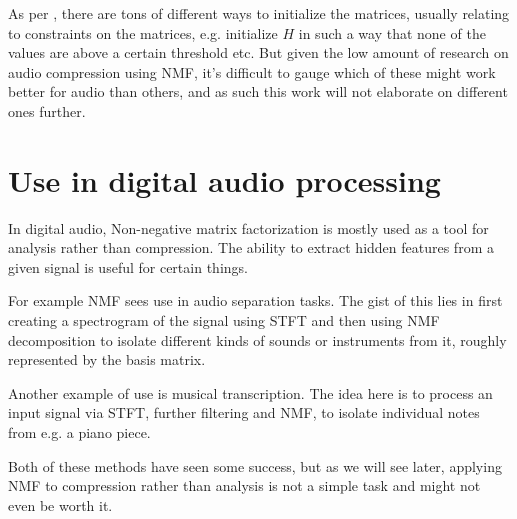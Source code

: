 As per \cite{naik_2015_nmf_advances}, there are tons of different ways to initialize the matrices, usually relating to constraints on the matrices, e.g. initialize $H$ in such a way that none of the values are above a certain threshold etc. But given the low amount of research on audio compression using NMF, it's difficult to gauge which of these might work better for audio than others, and as such this work will not elaborate on different ones further.

\section{Use in digital audio processing}
In digital audio, Non-negative matrix factorization is mostly used as a tool for analysis rather than compression. The ability to extract hidden features from a given signal is useful for certain things.

For example NMF sees use in audio separation tasks. \cite{fevotte_audio_separation_2017} The gist of this lies in first creating a spectrogram of the signal using STFT and then using NMF decomposition to isolate different kinds of sounds or instruments from it, roughly represented by the basis matrix.

Another example of use is musical transcription. \cite{recoskie_mann_2014} The idea here is to process an input signal via STFT, further filtering and NMF, to isolate individual notes from e.g. a piano piece.

Both of these methods have seen some success, but as we will see later, applying NMF to compression rather than analysis is not a simple task and might not even be worth it.


